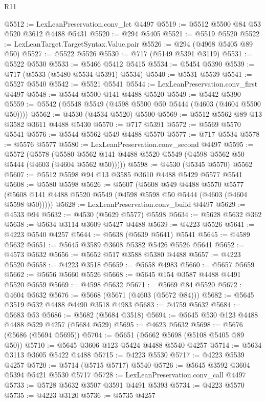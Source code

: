 \begin{lexlean}{R11}
\begin{coremodule}
@5512 := LexLeanPreservation.conv_let @4497
@5519 := @5512 @5500 @84 @53 @520 @3612 @4488 @5431
@5520 := @294 @5405
@5521 := @5519 @5520
@5522 := LexLeanTarget.TargetSyntax.Value.pair
@5526 := @294 (@4968 @5405 @89 @50)
@5527 := @5522 @5526
@5530 := @717 (@5149 @5391 @3119)
@5531 := @5522 @5530
@5533 := @5466 @5412 @5415
@5534 := @5454 @5390
@5539 := @717 (@5533 (@5480 @5534 @5391) @5534)
@5540 := @5531 @5539
@5541 := @5527 @5540
@5542 := @5521 @5541
@5544 := LexLeanPreservation.conv_first @4497
@5548 := @5544 @5500 @141 @4488 @5520
@5549 := @5442 @5390
@5559 := @5542 (@5548 @5549 (@4598 @5500 @50 @5444 (@4603 (@4604 @5500 @50))))
@5562 := @4530 (@4534 @5520) @5500
@5569 := @5512 @5562 @89 @13 @3582 @3611 @4488 @5430
@5570 := @717 @5391
@5572 := @5569 @5570 @5541
@5576 := @5544 @5562 @549 @4488 @5570
@5577 := @717 @5534
@5578 := @5576 @5577
@5580 := LexLeanPreservation.conv_second @4497
@5595 := @5572
    (@5578 (@5580 @5562 @141 @4488 @5520 @5549 (@4598 @5562 @50 @5444 (@4603 (@4604 @5562 @50)))))
@5598 := @4530 (@5345 @5570) @5562
@5607 := @5512 @5598 @94 @13 @3585 @3610 @4488 @5429 @5577 @5541
@5608 := @5580 @5598
@5626 := @5607
    (@5608
      @549
      @4488
      @5570
      @5577
      (@5608 @141 @4488 @5520 @5549 (@4598 @5598 @50 @5444 (@4603 (@4604 @5598 @50)))))
@5628 := LexLeanPreservation.conv_build @4497
@5629 := @4533 @94
@5632 := @4530 (@5629 @5577) @5598
@5634 := @5628 @5632 @362
@5638 := @5634 @3114 @3609 @5427 @4488
@5639 := @4223 @5526
@5641 := @4223 @5540 @4257
@5644 := @5638 (@5639 @5641) @5541
@5645 := @4589 @5632
@5651 := @5645 @3589 @3608 @5382 @5426 @5526 @5641
@5652 := @4573 @5632
@5656 := @5652 @517 @3588 @5380 @4488
@5657 := @4223 @5520
@5658 := @4223 @3518
@5659 := @5658 @4983
@5660 := @5657 @5659
@5662 := @5656 @5660 @5526
@5668 := @5645 @154 @3587 @4488 @4491 @5520 @5659
@5669 := @4598 @5632
@5671 := @5669 @84 @5520
@5672 := @4604 @5632
@5676 := @5668 (@5671 (@4603 (@5672 @84)))
@5682 := @5645 @3519 @532 @4488 @4490 @3518 @4983
@5683 := @4759 @5632
@5684 := @5683 @53
@5686 := @5682 (@5684 @3518)
@5694 := @5645 @530 @123 @4488 @4488 @529 @4257 (@5684 @529)
@5695 := @4623 @5632
@5698 := @5676 (@5686 (@5694 @5695))
@5704 := @5651 (@5662 @5698 (@5108 @5405 @89 @50))
@5710 := @5645 @3606 @123 @5424 @4488 @5540 @4257
@5714 := @5634 @3113 @3605 @5422 @4488
@5715 := @4223 @5530
@5717 := @4223 @5539 @4257
@5720 := @5714 (@5715 @5717) @5540
@5726 := @5645 @3592 @3604 @5394 @5421 @5530 @5717
@5728 := LexLeanPreservation.conv_call @4497
@5733 := @5728 @5632 @3507 @3591 @4491 @5393
@5734 := @4223 @5570
@5735 := @4223 @3120
@5736 := @5735 @4257

\end{coremodule}
\end{lexlean}
